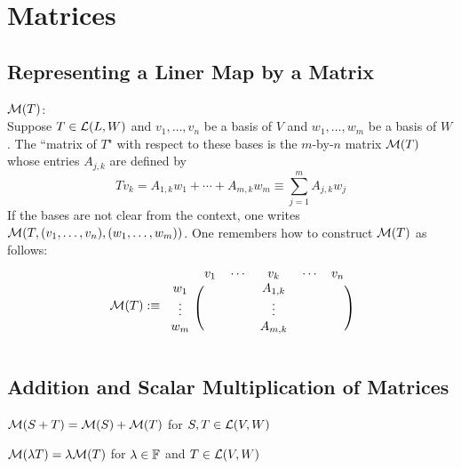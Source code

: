 \section{Matrices}
\subsection{Representing a Liner Map by a Matrix}

\setcounter{thm}{30}
\begin{mydef}
  \label{matrix-of-linear-map}
   $\mathcal{M}(T)$: \\
  Suppose $T \in \mathcal{L} (L,W)$ and $v_1, \dots, v_n$ be a basis of $V$ and $w_1, \dots, w_m$ be a basis of $W$. The ``matrix of $T$" with respect to these bases is the $m$-by-$n$ matrix $\mathcal{M}(T)$ whose entries $A_{j,k}$ are defined by
  \begin{equation}
    T v_k = A_{1,k} w_1 + \cdots + A_{m,k} w_m \equiv \sum_{j=1}^{m} A_{j,k} w_j
  \end{equation}
  If the bases are not clear from the context, one writes $\mathcal{M}(T, (v_1, \dots, v_n),(w_1, \dots, w_m))$. One remembers how to construct $\mathcal{M}(T)$ as follows:
  \begin{equation}
    \mathcal{M} (T) :\equiv
    \begin{blockarray}{cccc}
      & v_1 \quad \cdots & v_k & \cdots \quad v_n \\
      \begin{block}{c(ccc)}
        w_1    & & A_{1,k} & \\
        \vdots & & \vdots & \\
        w_m    & & A_{m,k} & \\
      \end{block}
    \end{blockarray}
  \end{equation}
\end{mydef}


\subsection{Addition and Scalar Multiplication of Matrices}
\setcounter{thm}{34}
\begin{thm}
  $\mathcal{M}(S+T) = \mathcal{M}(S) + \mathcal{M}(T)$ for $S, T \in \mathcal{L} (V,W)$
\end{thm}

\setcounter{thm}{37}
\begin{thm}
  $\mathcal{M}(\lambda T) = \lambda \mathcal{M}(T)$ for $\lambda \in \mathbb{F}$ and $T \in \mathcal{L} (V,W)$
\end{thm}

